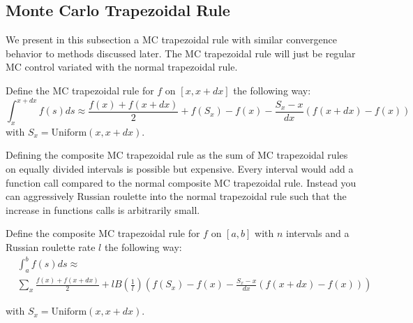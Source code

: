\documentclass[a4paper,12pt]{article}
\begin{document}
\subsection{Monte Carlo Trapezoidal Rule}
We present in this subsection a MC trapezoidal rule with similar convergence behavior to
methods discussed later. The MC trapezoidal rule will just be
regular MC control variated with the normal trapezoidal rule.

\begin{definition}
    Define the MC trapezoidal rule for $f$ on $[x,x+dx]$ the following
    way:
    \begin{equation}
        \int_{x}^{x+dx} f(s)ds \approx
        \frac{f(x)+f(x+dx)}{2} + f(S_{x})-f(x)-\frac{S_{x}-x}{dx} \left(f(x+dx)-f(x)\right)
    \end{equation}
    with $S_{x} = \text{Uniform}(x,x+dx)$.
\end{definition}


Defining the composite MC trapezoidal rule as
the sum of MC trapezoidal rules on equally divided intervals
is possible but expensive. Every interval would add a function call
compared to the normal composite MC trapezoidal rule. Instead
you can aggressively Russian roulette into the normal trapezoidal rule
such that the increase in functions calls is arbitrarily small.

\begin{definition} \label{MCtrap}
    Define the composite MC trapezoidal rule for $f$ on $[a,b]$ with
    $n$ intervals and a Russian roulette rate $l$ the following way:
    \begin{align}
         & \int_{a}^{b} f(s)ds \approx        \\
         & \sum_{x}  \frac{f(x)+f(x+dx)}{2} +
        l B \left(\frac{1}{l} \right)
        \left(f(S_{x})-f(x)-\frac{S_{x}-x}{dx}(f(x+dx)-f(x)) \right)
    \end{align}

    with $S_{x} = \text{Uniform}(x,x+dx)$.

\end{definition}
\end{document}
